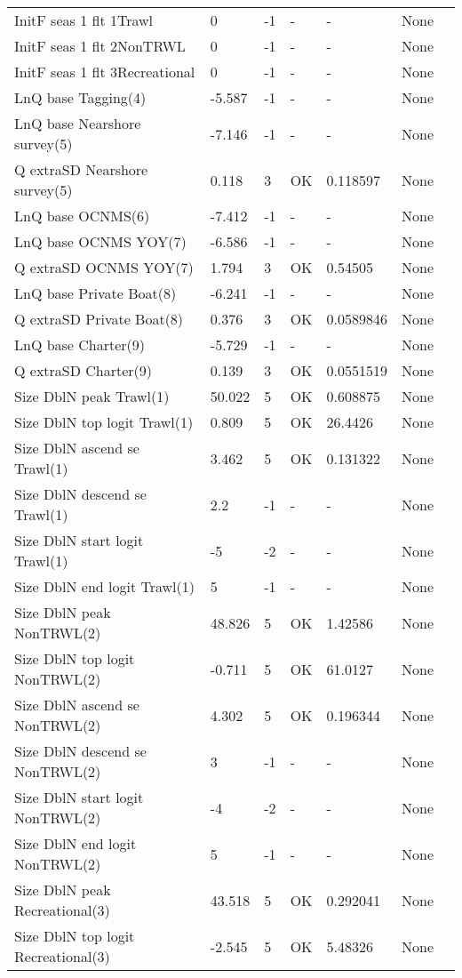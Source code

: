 \documentclass[11pt,
  english,
  letterpaper,
]{article}
\begin{document}
\begin{landscape}
\begin{longtable}[t]{>{\raggedright\arraybackslash}p{6cm}lllll>{\raggedright\arraybackslash}p{4cm}}
InitF seas 1 flt 1Trawl & 0 & -1 & - & - & None\\
InitF seas 1 flt 2NonTRWL & 0 & -1 & - & - & None\\
InitF seas 1 flt 3Recreational & 0 & -1 & - & - & None\\
LnQ base Tagging(4) & -5.587 & -1 & - & - & None\\
LnQ base Nearshore survey(5) & -7.146 & -1 & - & - & None\\
Q extraSD Nearshore survey(5) & 0.118 & 3 & OK & 0.118597 & None\\
LnQ base OCNMS(6) & -7.412 & -1 & - & - & None\\
LnQ base OCNMS YOY(7) & -6.586 & -1 & - & - & None\\
Q extraSD OCNMS YOY(7) & 1.794 & 3 & OK & 0.54505 & None\\
LnQ base Private Boat(8) & -6.241 & -1 & - & - & None\\
Q extraSD Private Boat(8) & 0.376 & 3 & OK & 0.0589846 & None\\
LnQ base Charter(9) & -5.729 & -1 & - & - & None\\
Q extraSD Charter(9) & 0.139 & 3 & OK & 0.0551519 & None\\
Size DblN peak Trawl(1) & 50.022 & 5 & OK & 0.608875 & None\\
Size DblN top logit Trawl(1) & 0.809 & 5 & OK & 26.4426 & None\\
Size DblN ascend se Trawl(1) & 3.462 & 5 & OK & 0.131322 & None\\
Size DblN descend se Trawl(1) & 2.2 & -1 & - & - & None\\
Size DblN start logit Trawl(1) & -5 & -2 & - & - & None\\
Size DblN end logit Trawl(1) & 5 & -1 & - & - & None\\
Size DblN peak NonTRWL(2) & 48.826 & 5 & OK & 1.42586 & None\\
Size DblN top logit NonTRWL(2) & -0.711 & 5 & OK & 61.0127 & None\\
Size DblN ascend se NonTRWL(2) & 4.302 & 5 & OK & 0.196344 & None\\
Size DblN descend se NonTRWL(2) & 3 & -1 & - & - & None\\
Size DblN start logit NonTRWL(2) & -4 & -2 & - & - & None\\
Size DblN end logit NonTRWL(2) & 5 & -1 & - & - & None\\
Size DblN peak Recreational(3) & 43.518 & 5 & OK & 0.292041 & None\\
Size DblN top logit Recreational(3) & -2.545 & 5 & OK & 5.48326 & None\\

\end{longtable}
\end{landscape}
\end{document}
